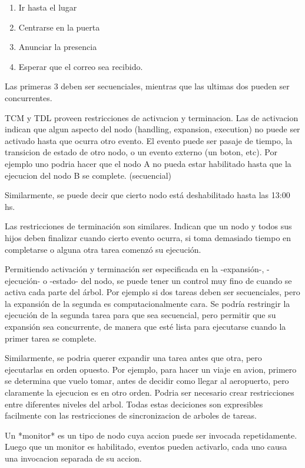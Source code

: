 \begin{enumerate}
\item Ir hasta el lugar
\item Centrarse en la puerta
\item Anunciar la presencia
\item Esperar que el correo sea recibido.
\end{enumerate}

Las primeras 3 deben ser secuenciales, mientras que las ultimas dos pueden 
ser concurrentes.

TCM y TDL proveen restricciones de activacion y terminacion.
Las de activacion indican que algun aspecto del nodo (handling, 
expansion, execution) no puede
ser activado hasta que ocurra otro evento. 
El evento puede ser pasaje de tiempo, la transicion de estado de otro nodo,
o un evento externo (un boton, etc).
Por ejemplo uno podria hacer que el nodo A no pueda estar habilitado hasta 
que la ejecucion del nodo B se complete. (secuencial)

Similarmente, se puede decir que cierto nodo está deshabilitado hasta las
13:00 hs.

Las restricciones de terminación son similares. Indican que un nodo y todos 
sus hijos deben finalizar cuando cierto evento ocurra, si
toma demasiado tiempo en completarse o alguna otra tarea comenzó su ejecución.

Permitiendo activación y terminación ser especificada en la -expansión-, 
-ejecución- o -estado- del nodo, se puede tener un control
muy fino de cuando se activa cada parte del árbol.
Por ejemplo si dos tareas deben ser secuenciales, pero la expansión de la 
segunda es computacionalmente cara. Se podría
restringir la ejecución de la segunda tarea para que sea secuencial, pero 
permitir que su expansión sea concurrente, de manera
que esté lista para ejecutarse cuando la primer tarea se complete.

Similarmente, se podria querer expandir una tarea antes que otra, pero 
ejecutarlas en orden opuesto. Por ejemplo, para hacer un
viaje en avion, primero se determina que vuelo tomar, antes de decidir como 
llegar al aeropuerto, pero claramente la ejecucion es en otro orden.
Podria ser necesario crear restricciones entre diferentes niveles del arbol.
Todas estas deciciones son expresibles facilmente con las restricciones de 
sincronizacion de arboles de tareas.


Un *monitor* es un tipo de nodo cuya accion puede ser invocada repetidamente. 
Luego que un monitor es habilitado, eventos
pueden activarlo, cada uno causa una invocacion separada de su accion.

